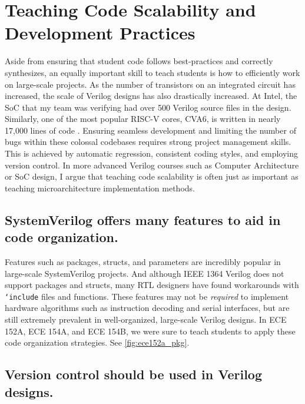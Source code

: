 
\chapter{Teaching Code Scalability and Development Practices}
\label{chapter:scalability}

Aside from ensuring that student code follows best-practices and correctly synthesizes, an equally important skill to teach students is how to efficiently work on large-scale projects. As the number of transistors on an integrated circuit has increased, the scale of Verilog designs has also drastically increased. At Intel, the SoC that my team was verifying had over 500 Verilog source files in the design. Similarly, one of the most popular RISC-V cores, CVA6, is written in nearly 17,000 lines of code \cite{cva6}. Ensuring seamless development and limiting the number of bugs within these colossal codebases requires strong project management skills. This is achieved by automatic regression, consistent coding styles, and employing version control. In more advanced Verilog courses such as Computer Architecture or SoC design, I argue that teaching code scalability is often just as important as teaching microarchitecture implementation methods.

\section{SystemVerilog offers many features to aid in code organization.}



Features such as packages, structs, and parameters are incredibly popular in large-scale SystemVerilog projects. And although IEEE 1364 Verilog does not support packages and structs, many RTL designers have found workarounds with \texttt{`include} files and functions. \cite{lowRISCstyleguides, zachjssv2vGitHub} These features may not be \emph{required} to implement hardware algorithms such as instruction decoding and serial interfaces, but are still extremely prevalent in well-organized, large-scale Verilog designs. In ECE 152A, ECE 154A, and ECE 154B, we were sure to teach students to apply these code organization strategies. See \autoref{fig:ece152a_pkg}.

\section{Version control should be used in Verilog designs.}

